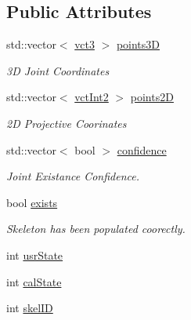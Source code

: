 \subsection*{Public Attributes}
\begin{DoxyCompactItemize}
\item 
std\-::vector$<$ \hyperlink{vct_fixed_size_vector_types_8h_a3af82acdbf4eeb73c551909240b106ea}{vct3} $>$ \hyperlink{classosa_open_n_i_skeleton_a69590f30ce352cd80be31757dcea8351}{points3\-D}
\begin{DoxyCompactList}\small\item\em 3\-D Joint Coordinates \end{DoxyCompactList}\item 
std\-::vector$<$ \hyperlink{vct_fixed_size_vector_types_8h_add8c88eb6a432b15f14b866b9c35325f}{vct\-Int2} $>$ \hyperlink{classosa_open_n_i_skeleton_af72455ac2eb4611fefc465d08a415b59}{points2\-D}
\begin{DoxyCompactList}\small\item\em 2\-D Projective Coorinates \end{DoxyCompactList}\item 
std\-::vector$<$ bool $>$ \hyperlink{classosa_open_n_i_skeleton_ac7f0ce45a28ff3065dc83f2e71175987}{confidence}
\begin{DoxyCompactList}\small\item\em Joint Existance Confidence. \end{DoxyCompactList}\item 
bool \hyperlink{classosa_open_n_i_skeleton_aaad274b86c6213c48c1aa2bdcd053195}{exists}
\begin{DoxyCompactList}\small\item\em Skeleton has been populated coorectly. \end{DoxyCompactList}\item 
int \hyperlink{classosa_open_n_i_skeleton_afd56b36e28cdc37b1f8e9e028537af41}{usr\-State}
\item 
int \hyperlink{classosa_open_n_i_skeleton_a3edad6b75218a0029aba98aacdf19aae}{cal\-State}
\item 
int \hyperlink{classosa_open_n_i_skeleton_acff0bacc1bc0f3411a2ee8ebd541e1b9}{skel\-I\-D}
\end{DoxyCompactItemize}


